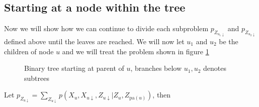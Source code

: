 \subsection*{Starting at a node within the tree}
Now we will show how we can continue to divide each subproblem $p_{Z_{u_1 \downarrow}}$ and $p_{Z_{u_2 \downarrow}}$ defined above until the leaves are reached. We will now let $u_{1}$ and $u_{2}$ be the children of node $u$ and we will treat the problem shown in figure \ref{within_tree}


\begin{figure}[H]
\begin{center}
\end{center}
  \caption{Binary tree starting at parent of $u$, branches below $u_1, u_2$ denotes subtrees}
  \label{within_tree}
\end{figure}

Let $p_{Z_{u \downarrow}} = \sum_{Z_{u \downarrow}} p(X_u, X_{u \downarrow}, Z_{u \downarrow}|Z_u, Z_{\text{pa}(u)})$, then

